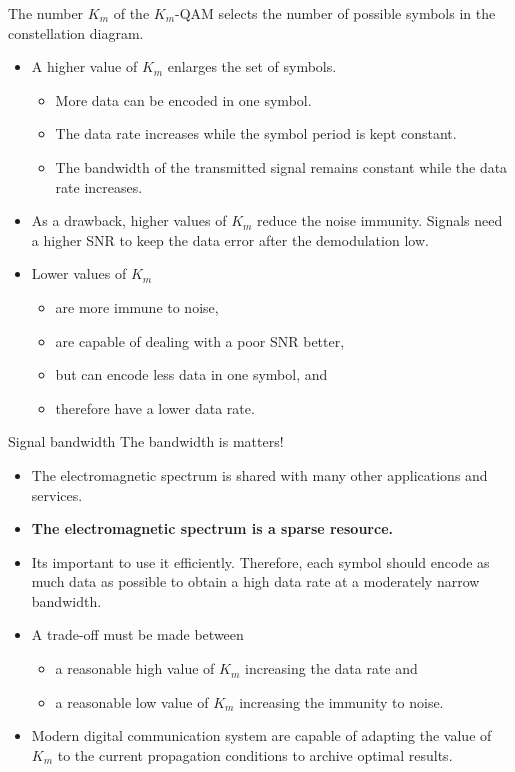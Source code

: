 \begin{refsection}
The number $K_m$ of the $K_m$-\acs{QAM} selects the number of possible symbols in the constellation diagram.
\begin{itemize}
	\item A higher value of $K_m$ enlarges the set of symbols.
	\begin{itemize}
		\item More data can be encoded in one symbol.
		\item The data rate increases while the symbol period is kept constant.
		\item The bandwidth of the transmitted signal remains constant while the data rate increases.
	\end{itemize}
	\item As a drawback, higher values of $K_m$ reduce the noise immunity. Signals need a higher \ac{SNR} to keep the data error after the demodulation low.
	\item Lower values of $K_m$
	\begin{itemize}
		\item are more immune to noise,
		\item are capable of dealing with a poor \ac{SNR} better,
		\item but can encode less data in one symbol, and
		\item therefore have a lower data rate.
	\end{itemize}
\end{itemize}

\begin{excursus}{Signal bandwidth}
	The bandwidth is matters!
	\begin{itemize}
		\item The electromagnetic spectrum is shared with many other applications and services.
		\item \textbf{The electromagnetic spectrum is a sparse resource.}
		\item Its important to use it efficiently. Therefore, each symbol should encode as much data as possible to obtain a high data rate at a moderately narrow bandwidth.
		\item A trade-off must be made between
		\begin{itemize}
			\item a reasonable high value of $K_m$ increasing the data rate and
			\item a reasonable low value of $K_m$ increasing the immunity to noise.
		\end{itemize}
		\item Modern digital communication system are capable of adapting the value of $K_m$ to the current propagation conditions to archive optimal results.
	\end{itemize}
\end{excursus}


\end{refsection}
